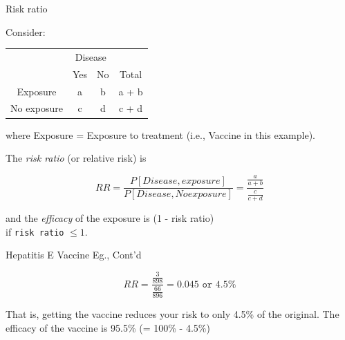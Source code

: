 \documentclass[14pt]{beamer}\usepackage[]{graphicx}\usepackage[]{color}
\begin{document}
\begin{frame}[fragile]{Risk ratio}

{\small{
Consider:
\vspace{2mm}

\begin{tabular}{@{} cccc @{}} \hline
     & \multicolumn{2}{c}{Disease} \\
     & Yes & No & Total \\ \hline
Exposure & a & b & a + b \\
No exposure & c & d & c + d \\ \hline
\end{tabular}

where Exposure = Exposure to treatment (i.e., Vaccine in this example).

\vspace{2mm}

The \textit{risk ratio} (or relative risk) is

\begin{equation*}
RR = \frac{ P[ Disease, exposure]}{ P[ Disease, No exposure]} = \frac{ \frac{a}{a+b}}{ \frac{c}{c+d}} 
\end{equation*}

and the \textit{efficacy} of the exposure is (1 - risk ratio) \\ if \texttt{risk ratio} $ \le 1$. 

}}
\end{frame}

\begin{frame}[fragile]{Hepatitis E Vaccine Eg., Cont'd}

\begin{equation*}
RR = \frac{ \frac{3}{898}}{ \frac{66}{896}} = 0.045 \texttt{ or } 4.5\%
\end{equation*}

\vspace{3mm}

That is, getting the vaccine reduces your risk to only 4.5\% of the  original. The efficacy of the vaccine is 95.5\% (= 100\% - 4.5\%)

\end{frame}
\end{document}
